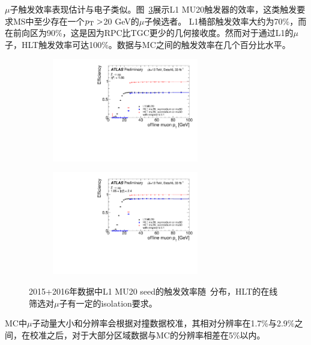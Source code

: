 $\mu$子触发效率\cite{Muon-trigger-results}表现估计与电子类似。图~\ref{fig:muon_trigger_eff}展示L1 MU20触发器的效率，这类触发要求MS中至少存在一个$p_{\text{T}}>$20 GeV的$\mu$子候选者。
L1桶部触发效率大约为70\%，而在前向区为90\%，这是因为RPC比TGC更少的几何接收度。然而对于通过L1的$\mu$子，HLT触发效率可达100\%。数据与MC之间的触发效率在几个百分比水平。
\begin{figure}[h]
\begin{center}
\begin{subfigure}[b]{0.45\textwidth}
\centering
      \includegraphics[width=0.7\textwidth,angle=-90]{fig/HLT_mu26_ivarmedium_OR_HLT_mu50_Medium_IsoFixedCutTightTrackOnly_barrel_probe_pt_eff.pdf}
     \caption{}
      \label{fig:muon_trigger_eff_pt_barrel}
  \end{subfigure}
 \begin{subfigure}[b]{0.45\textwidth}
 \centering
      \includegraphics[width=0.7\textwidth,angle=-90]{fig/HLT_mu26_ivarmedium_OR_HLT_mu50_Medium_IsoFixedCutTightTrackOnly_endcap_probe_pt_eff.pdf}
      \caption{}
      \label{fig:muon_trigger_eff_pt_endcap}
  \end{subfigure}
\caption{2015+2016年数据中L1 MU20 seed的触发效率随\pT~分布\cite{Muon-trigger-results}，HLT的在线筛选对$\mu$子有一定的isolation要求。}
 \label{fig:muon_trigger_eff}
\end{center}
\end{figure}
MC中$\mu$子动量大小和分辨率会根据对撞数据校准\cite{Aad2016-mu2016}，其相对分辨率在1.7\%与2.9\%之间，在校准之后，对于大部分\abseta 区域数据与MC的分辨率相差在5\%以内。

